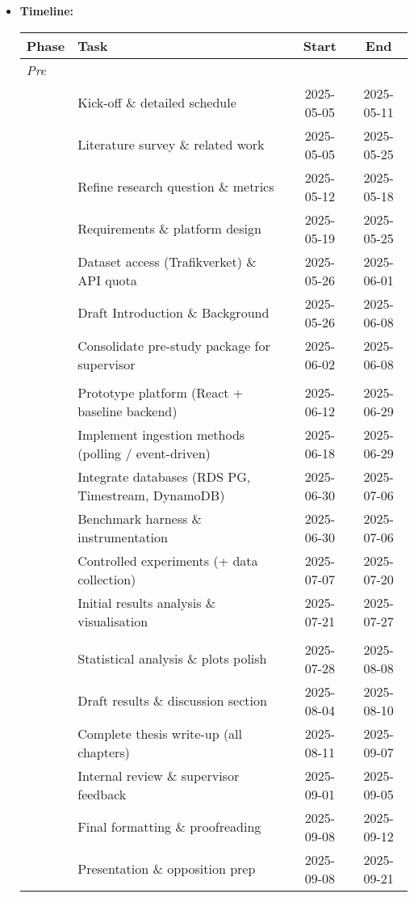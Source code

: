 \documentclass[11pt]{article}
\begin{document}
\begin{itemize}[leftmargin=*, label={}]
  \item %
  \newpage
  \textbf{Timeline:}
    \begin{center}
\small
\begin{tabular}{@{}llcc@{}}
\toprule
\textbf{Phase} & \textbf{Task} & \textbf{Start} & \textbf{End} \\
\midrule
\multicolumn{4}{l}{\textit{Pre}}\\
 & Kick-off \& detailed schedule                & 2025-05-05 & 2025-05-11 \\
 & Literature survey \& related work            & 2025-05-05 & 2025-05-25 \\
 & Refine research question \& metrics          & 2025-05-12 & 2025-05-18 \\
 & Requirements \& platform design              & 2025-05-19 & 2025-05-25 \\
 & Dataset access (Trafikverket) \& API quota   & 2025-05-26 & 2025-06-01 \\
 & Draft Introduction \& Background             & 2025-05-26 & 2025-06-08 \\
 & Consolidate pre-study package for supervisor & 2025-06-02 & 2025-06-08 \\
\addlinespace
\multicolumn{4}{l}{\textit{Main}}\\
 & Prototype platform (React + baseline backend)        & 2025-06-12 & 2025-06-29 \\
 & Implement ingestion methods (polling / event-driven) & 2025-06-18 & 2025-06-29 \\
 & Integrate databases (RDS PG, Timestream, DynamoDB)   & 2025-06-30 & 2025-07-06 \\
 & Benchmark harness \& instrumentation                 & 2025-06-30 & 2025-07-06 \\
 & Controlled experiments (+ data collection)           & 2025-07-07 & 2025-07-20 \\
 & Initial results analysis \& visualisation            & 2025-07-21 & 2025-07-27 \\
\addlinespace
\multicolumn{4}{l}{\textit{Wrap-up}}\\
 & Statistical analysis \& plots polish        & 2025-07-28 & 2025-08-08 \\
 & Draft results \& discussion section         & 2025-08-04 & 2025-08-10 \\
 & Complete thesis write-up (all chapters)     & 2025-08-11 & 2025-09-07 \\
 & Internal review \& supervisor feedback      & 2025-09-01 & 2025-09-05 \\
 & Final formatting \& proofreading            & 2025-09-08 & 2025-09-12 \\
 & Presentation \& opposition prep             & 2025-09-08 & 2025-09-21 \\
\bottomrule
\end{tabular}
\end{center}
\end{itemize}



\begingroup
\small


\endgroup
\end{document}
